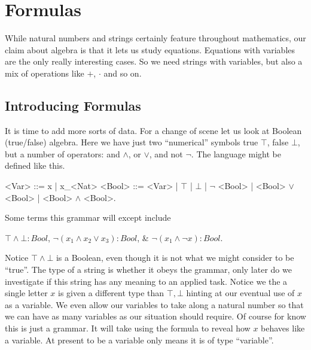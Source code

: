 \chapter{Formulas}
While natural numbers and strings certainly feature throughout mathematics, 
our claim about algebra is that it lets us study equations.  Equations 
with variables are the only really interesting cases.  So we need 
strings with variables, but also a mix of operations like $+$, $\cdot$ and 
so on.

\section{Introducing Formulas}
It is time to add more sorts of data.  For a change of scene let us look 
at Boolean (true/false) algebra.  Here we have just two ``numerical''
symbols true $\top$,
false $\bot$, but a number of operators: and $\wedge$, or $\vee$, and not $\neg$.
The language might be defined
like this.
\begin{Gcode}[]
<Var>  ::= x | x_<Nat>
<Bool> ::= <Var>
        | $\top$
        | $\bot$
        | $\neg$ <Bool> 
        | <Bool> $\vee$ <Bool> 
        | <Bool> $\wedge$ <Bool>.
\end{Gcode}
Some terms this grammar will except include 
\begin{center}
    $\top \wedge \bot :Bool$, 
    $\neg (x_1\wedge x_2\vee x_3):Bool$, \&
    $\neg(x_1\wedge \neg x):Bool$.
\end{center}
Notice $\top\wedge \bot$ is a Boolean, even though it is not what we might 
consider to be ``true''.   The type of a string is whether it obeys the grammar,
only later do we investigate if this string has any meaning to an applied task.
Notice we the a single letter $x$ is given a different type than $\top,\bot$
hinting at our eventual use of $x$ as a variable.  We even allow our variables 
to take along a natural number so that we can have as many variables as our situation 
should require.  Of course for know this is just a grammar.  It will take using 
the formula to reveal how $x$ behaves like a variable.  At present to be 
a variable only means it is of type ``variable''.



